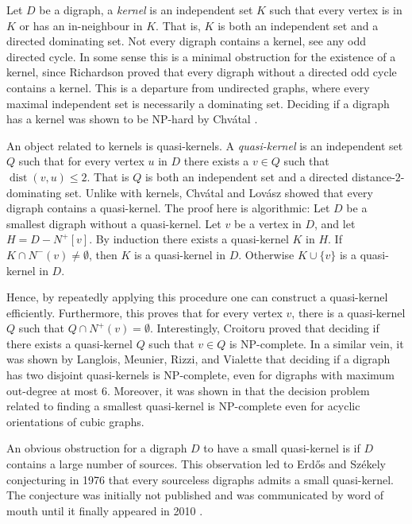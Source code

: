 \documentclass[12pt]{article}
\theoremstyle{definition}
\DeclareMathOperator{\dist}{dist}
\begin{document}
Let $D$ be a digraph,
a \emph{kernel} is an independent set $K$ such that every vertex is in $K$ or has an in-neighbour in $K$.
That is, $K$ is both an independent set and a directed dominating set.
Not every digraph contains a kernel, see any odd directed cycle.
In some sense this is a minimal obstruction for the existence of a kernel, 
since Richardson \cite{richardson1953solutions} 
proved that every digraph without a directed odd cycle contains a kernel.
This is a departure from undirected graphs, where every maximal independent set is necessarily a dominating set.
Deciding if a digraph has a kernel was shown to be NP-hard by Chv{\'a}tal \cite{chvatal1973computational}.

An object related to kernels is quasi-kernels.
A \emph{quasi-kernel} is an independent set $Q$ such that for every vertex $u$ in $D$ there exists a $v\in Q$ such that $\dist(v,u) \leq 2$.
That is $Q$ is both an independent set and a directed distance-$2$-dominating set.
Unlike with kernels, Chv\'atal and Lov\'asz \cite{chvatal1974every} showed that every digraph contains a quasi-kernel.
The proof here is algorithmic:
Let $D$ be a smallest digraph without a quasi-kernel. 
Let $v$ be a vertex in $D$, and let $H = D - N^{+}[v]$.
By induction there exists a quasi-kernel $K$ in $H$.
If $K\cap N^-(v)\neq \emptyset$, then $K$ is a quasi-kernel in $D$.
Otherwise $K\cup \{v\}$ is a quasi-kernel in $D$.

Hence, by repeatedly applying this procedure one can construct a quasi-kernel efficiently.
Furthermore, this proves that for every vertex $v$, there is a quasi-kernel $Q$ such that $Q \cap N^{+}(v)= \emptyset$.
Interestingly, Croitoru \cite{croitoru2015note} proved that deciding if there exists a quasi-kernel $Q$ such that $v \in Q$
is NP-complete.
In a similar vein, 
it was shown by Langlois, Meunier, Rizzi, and Vialette \cite{langlois2022algorithmic}
that deciding if a digraph has two disjoint quasi-kernels is NP-complete, even for digraphs with maximum out-degree at most $6$.
Moreover, it was shown in \cite{langlois2022algorithmic} 
that the decision problem related to finding a smallest quasi-kernel
is NP-complete
even for acyclic orientations of cubic
graphs.


An obvious obstruction for a digraph $D$ to have a small quasi-kernel is if $D$ contains a large number of sources.
This observation led to Erd\H{o}s and Sz\'ekely conjecturing in 1976 that every sourceless digraphs admits a small quasi-kernel.
The conjecture was initially not published and was communicated by
word of mouth until it finally appeared in 2010 \cite{erdos2010two}.
\end{document}
